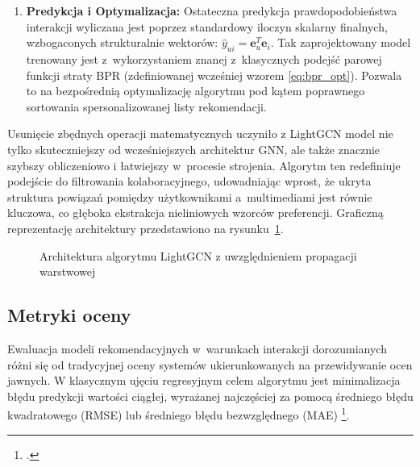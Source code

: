 \begin{enumerate}
          \begin{equation}
              \mathbf{e}_u = \sum_{k=0}^K \alpha_k \mathbf{e}_u^{(k)},
          \end{equation}

          gdzie $K$ to łączna liczba wykorzystanych warstw konwolucyjnych (zazwyczaj od 2 do 4), a $\alpha_k$ to waga przypisana danej warstwie (domyślnie przyjmuje się stałą wartość $\alpha_k = \frac{1}{K+1}$, traktując wszystkie kroki propagacji równorzędnie).

    \item \textbf{Predykcja i Optymalizacja:} Ostateczna predykcja prawdopodobieństwa interakcji wyliczana jest poprzez standardowy iloczyn skalarny finalnych, wzbogaconych strukturalnie wektorów: $\hat{y}_{ui} = \mathbf{e}_u^T \mathbf{e}_i$. Tak zaprojektowany model trenowany jest z~wykorzystaniem znanej z~klasycznych podejść parowej funkcji straty BPR (zdefiniowanej wcześniej wzorem \eqref{eq:bpr_opt}). Pozwala to na bezpośrednią optymalizację algorytmu pod kątem poprawnego sortowania spersonalizowanej listy rekomendacji.
\end{enumerate}

Usunięcie zbędnych operacji matematycznych uczyniło z LightGCN model nie tylko skuteczniejszy od wcześniejszych architektur GNN, ale także znacznie szybszy obliczeniowo i łatwiejszy w~procesie strojenia. Algorytm ten redefiniuje podejście do filtrowania kolaboracyjnego, udowadniając wprost, że ukryta struktura powiązań pomiędzy użytkownikami a~multimediami jest równie kluczowa, co głęboka ekstrakcja nieliniowych wzorców preferencji. Graficzną reprezentację architektury przedstawiono na rysunku~\ref{fig:lightgcn_architecture}.

\begin{figure}[htbp]
    \centering
    
    \caption{Architektura algorytmu LightGCN z uwzględnieniem propagacji warstwowej}
    \label{fig:lightgcn_architecture}
    \vspace{0.2cm}
\end{figure}

\subsection{Metryki oceny}
Ewaluacja modeli rekomendacyjnych w~warunkach interakcji dorozumianych różni się  od tradycyjnej oceny systemów ukierunkowanych na przewidywanie ocen jawnych. W klasycznym ujęciu regresyjnym celem algorytmu jest minimalizacja błędu predykcji wartości ciągłej, wyrażanej najczęściej za pomocą średniego błędu kwadratowego (RMSE) lub średniego błędu bezwzględnego (MAE) \footcite{shaniEvaluatingRecommendationSystems2011}.

